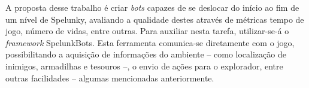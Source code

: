 A proposta desse trabalho é criar \textit{bots} capazes de se deslocar do início
ao fim de um nível de Spelunky, avaliando a qualidade destes através de métricas
tempo de jogo, número de vidas, entre outras.  Para auxiliar nesta tarefa,
utilizar-se-á o \textit{framework} SpelunkBots.  Esta ferramenta comunica-se
diretamente com o jogo, possibilitando a aquisição de informações do ambiente --
como localização de inimigos, armadilhas e tesouros --, o envio de ações para o
explorador, entre outras facilidades -- algumas mencionadas anteriormente.
